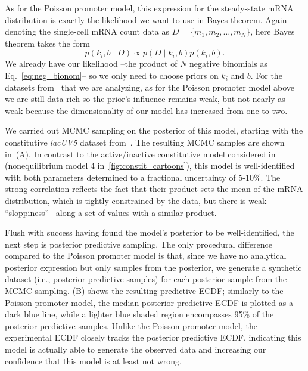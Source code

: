 As for the Poisson promoter model, this expression for the steady-state mRNA
distribution is exactly the likelihood we want to use in Bayes theorem. Again
denoting the single-cell mRNA count data as $D=\{m_1, m_2,\dots, m_N\}$, here
Bayes theorem takes the form
\begin{equation}
p(k_i, b \mid D) \propto p(D\mid k_i,b)p(k_i, b).
\end{equation}
We already have our likelihood --the product of $N$ negative binomials as
Eq.~\ref{eq:neg_bionom}--  so we only need to choose priors on $k_i$ and $b$.
For the datasets from~\cite{Jones2014} that we are analyzing, as for the Poisson
promoter model above we are still data-rich so the prior's influence remains
weak, but not nearly as weak because the dimensionality of our model has
increased from one to two.

We carried out MCMC sampling on the posterior of this model, starting with the
constitutive \textit{lacUV5} dataset from~\cite{Jones2014}. The resulting MCMC
samples are shown in~(A). In contrast to the
active/inactive constitutive model considered in~\cite{Razo-Mejia2020}
(nonequilibrium model 4 in~\ref{fig:constit_cartoons}), this model is
well-identified with both parameters determined to a fractional uncertainty of
5-10\%. The strong correlation reflects the fact that their product sets the
mean of the mRNA distribution, which is tightly constrained by the data, but
there is weak ``sloppiness''~\cite{Transtrum2015} along a set of values with a
similar product.

Flush with success having found the model's posterior to be well-identified, the
next step is posterior predictive sampling. The only procedural difference
compared to the Poisson promoter model is that, since we have no analytical
posterior expression but only samples from the posterior, we generate a
synthetic dataset (i.e., posterior predictive samples) for each posterior sample
from the MCMC sampling. (B) shows the resulting
predictive ECDF; similarly to the Poisson promoter model, the median posterior
predictive ECDF is plotted as a dark blue line, while a lighter blue shaded
region encompasses 95\% of the posterior predictive samples. Unlike the Poisson
promoter model, the experimental ECDF closely tracks the posterior predictive
ECDF, indicating this model is actually able to generate the observed data and
increasing our confidence that this model is at least not wrong.

